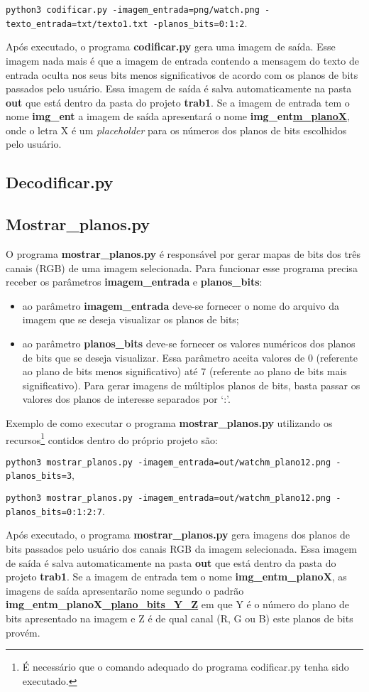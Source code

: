 \documentclass{article}
\begin{document}
\lstinline{python3 codificar.py -imagem_entrada=png/watch.png -texto_entrada=txt/texto1.txt -planos_bits=0:1:2}.

\noindent
Após executado, o programa \textbf{codificar.py} gera uma imagem de saída. Esse imagem nada mais é que a imagem de entrada contendo a mensagem do texto de entrada oculta nos seus bits menos significativos de acordo com os planos de bits passados pelo usuário. Essa imagem de saída é salva automaticamente na pasta \textbf{out} que está dentro da pasta do projeto \textbf{trab1}. Se a imagem de entrada tem o nome \textbf{img\_ent} a imagem de saída apresentará o nome \textbf{img\_ent\underline{m\_planoX}}, onde o letra X é um \textit{placeholder} para os números dos planos de bits escolhidos pelo usuário.

\subsection{Decodificar.py}


\subsection{Mostrar\_planos.py}
O programa \textbf{mostrar\_planos.py} é responsável por gerar mapas de bits dos três canais (RGB) de uma imagem selecionada. Para funcionar esse programa precisa receber os parâmetros \textbf{imagem\_entrada} e \textbf{planos\_bits}:

\begin{itemize}
	\item ao parâmetro \textbf{imagem\_entrada} deve-se fornecer o nome do arquivo da imagem que se deseja visualizar os planos de bits;
	\item ao parâmetro \textbf{planos\_bits} deve-se fornecer os valores numéricos dos planos de bits que se deseja visualizar. Essa parâmetro aceita valores de 0 (referente ao plano de bits menos significativo) até 7 (referente ao plano de bits mais significativo). Para gerar imagens de múltiplos planos de bits, basta passar os valores dos planos de interesse separados por `:'.
\end{itemize}

\noindent
Exemplo de como executar o programa \textbf{mostrar\_planos.py} utilizando os recursos\footnote{É necessário que o comando adequado do programa codificar.py tenha sido executado.} contidos dentro do próprio projeto são:

\lstinline{python3 mostrar_planos.py -imagem_entrada=out/watchm_plano12.png -planos_bits=3},

\lstinline{python3 mostrar_planos.py -imagem_entrada=out/watchm_plano12.png -planos_bits=0:1:2:7}.

\noindent
Após executado, o programa \textbf{mostrar\_planos.py} gera imagens dos planos de bits passados pelo usuário dos canais RGB da imagem selecionada. Essa imagem de saída é salva automaticamente na pasta \textbf{out} que está dentro da pasta do projeto \textbf{trab1}. Se a imagem de entrada tem o nome \textbf{img\_entm\_planoX}, as imagens de saída apresentarão nome segundo o padrão \textbf{img\_entm\_planoX\underline{\_plano\_bits\_Y\_Z}} em que Y é o número do plano de bits apresentado na imagem e Z é de qual canal (R, G ou B) este planos de bits provém.
\end{document}
